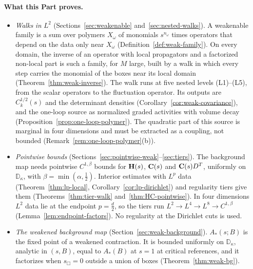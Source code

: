 \paragraph{What this Part proves.}
\begin{itemize}
\item \emph{Walks in $L^2$} (Sections~\ref{sec:weakenable} and~\ref{sec:nested-walks}). A weakenable family is a sum over polymers $X_\omega$ of monomials $s^{n_\omega}$ times operators that depend on the data only near $X_\omega$ (Definition~\ref{def:weak-family}). On every domain, the inverse of an operator with local propagators and a factorized non-local part is such a family, for $M$ large, built by a walk in which every step carries the monomial of the boxes near its local domain (Theorem~\ref{thm:weak-inverse}). The walk runs at five nested levels (L1)--(L5), from the scalar operators to the fluctuation operator. Its outputs are $C_k^{1/2}(s)$ and the determinant densities (Corollary~\ref{cor:weak-covariance}), and the one-loop source as normalized graded activities with volume decay (Proposition~\ref{prop:one-loop-polymer}). The quadratic part of this source is marginal in four dimensions and must be extracted as a coupling, not bounded (Remark~\ref{rem:one-loop-polymer}(b)).
\item \emph{Pointwise bounds} (Sections~\ref{sec:pointwise-weak}--\ref{sec:tiers}). The background map needs pointwise $C^{1,\beta}$ bounds for $\mathbf H(s)$, $\mathbf C(s)$ and $\mathbf C(s)D^T$, uniformly on $\mathbb D_\kappa$, with $\beta=\min(\alpha,\frac12)$. Interior estimates with $L^p$ data (Theorem~\ref{thm:lp-local}, Corollary~\ref{cor:lp-dirichlet}) and regularity tiers give them (Theorems~\ref{thm:tier-walk} and~\ref{thm:HC-pointwise}). In four dimensions $L^2$ data lie at the endpoint $p=\frac d2$, so the tiers run $L^2\to L^4\to L^8\to C^{1,\beta}$ (Lemma~\ref{lem:endpoint-factors}). No regularity at the Dirichlet cuts is used.
\item \emph{The weakened background map} (Section~\ref{sec:weak-background}). $A_*(s;B)$ is the fixed point of a weakened contraction. It is bounded uniformly on $\mathbb D_\kappa$, analytic in $(s,B)$, equal to $A_*(B)$ at $s=1$ at critical references, and it factorizes when $s_\Box=0$ outside a union of boxes (Theorem~\ref{thm:weak-bg}).
\end{itemize}


